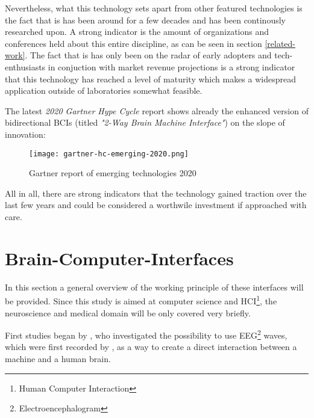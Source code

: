            Nevertheless, what this technology sets apart from other featured technologies is the fact that is has been around for a few decades and has been continously researched upon. A strong indicator is the amount of organizations and conferences held about this entire discipline, as can be seen in section \ref*{related-work}. The fact that is has only been on the radar of early adopters and tech-enthusiasts in conjuction with market revenue projections is a strong indicator that this technology has reached a level of maturity which makes a widespread application outside of laboratories somewhat feasible.

            The latest \textit{2020 Gartner Hype Cycle} report shows already the enhanced version of bidirectional BCIs (titled \textit{"2-Way Brain Machine Interface"}) on the slope of innovation:

            \begin{figure}[h]     %
                \centering
                \texttt{[image: gartner-hc-emerging-2020.png]} 
                \caption{Gartner report of emerging technologies 2020}\label{gartner-2020}
            \end{figure}

            All in all, there are strong indicators that the technology gained traction over the last few years and could be considered a worthwile investment if approached with care.

        \section{Brain-Computer-Interfaces}\label{intro-bci}

            In this section a general overview of the working principle of these interfaces will be provided. Since this study is aimed at computer science and HCI\footnote{Human Computer Interaction}, the neuroscience and medical domain will be only covered very briefly.


            First studies began by \cite{Vidal.1973}, who investigated the possibility to use EEG\footnote{Electroencephalogram} waves, which were first recorded by \cite{Berger.1929}, as a way to create a direct interaction between a machine and a human brain. 


